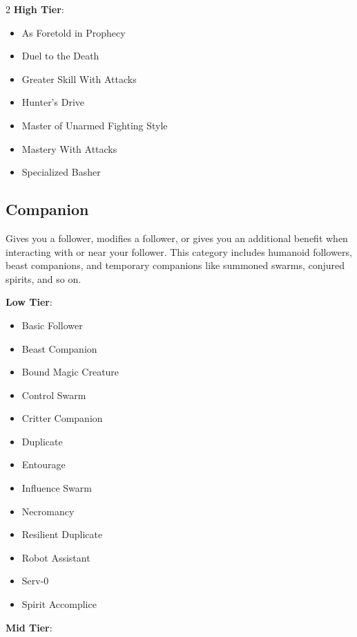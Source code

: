 \begin{multicols}{2}
\textbf{High Tier}:

\begin{itemize}
\item As Foretold in Prophecy
\item Duel to the Death
\item Greater Skill With Attacks
\item Hunter’s Drive
\item Master of Unarmed Fighting Style
\item Mastery With Attacks
\item Specialized Basher
\end{itemize}

\subsection{Companion}

Gives you a follower, modifies a follower, or gives you an additional benefit when interacting with or near your follower. This category includes humanoid followers, beast companions, and temporary companions like summoned swarms, conjured spirits, and so on.

\textbf{Low Tier}:

\begin{itemize}
\item Basic Follower
\item Beast Companion
\item Bound Magic Creature
\item Control Swarm
\item Critter Companion
\item Duplicate
\item Entourage
\item Influence Swarm
\item Necromancy
\item Resilient Duplicate
\item Robot Assistant
\item Serv-0
\item Spirit Accomplice
\end{itemize}

\textbf{Mid Tier}:


\end{multicols}
